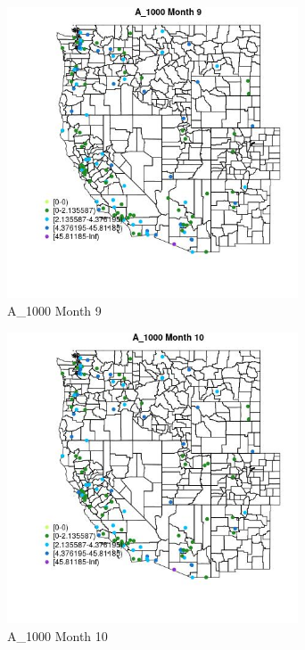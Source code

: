 \begin{figure} 
\centering  
\includegraphics[width=0.77\textwidth]{Code_Outputs/Report_ML_input_PM25_Step4_part_e_de_duplicated_aves_MapObsMo9A_1000.jpg} 
\caption{\label{fig:Report_ML_input_PM25_Step4_part_e_de_duplicated_avesMapObsMo9A_1000}A_1000 Month 9} 
\end{figure} 
 

\clearpage 

\begin{figure} 
\centering  
\includegraphics[width=0.77\textwidth]{Code_Outputs/Report_ML_input_PM25_Step4_part_e_de_duplicated_aves_MapObsMo10A_1000.jpg} 
\caption{\label{fig:Report_ML_input_PM25_Step4_part_e_de_duplicated_avesMapObsMo10A_1000}A_1000 Month 10} 
\end{figure} 
 

